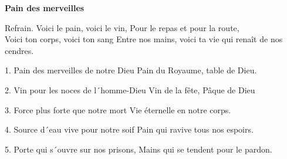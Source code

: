 \textbf{Pain des merveilles}

Refrain.
Voici le pain, voici le vin,
Pour le repas et pour la route,\\
Voici ton corps, voici ton sang
Entre nos mains, voici ta vie qui renaît de nos cendres.

1.
Pain des merveilles de notre Dieu
Pain du Royaume, table de Dieu.

2.
Vin pour les noces de l´homme-Dieu
Vin de la fête, Pâque de Dieu

3.
Force plus forte que notre mort
Vie éternelle en notre corps.

4.
Source d´eau vive pour notre soif
Pain qui ravive tous nos espoirs.

5.
Porte qui s´ouvre sur nos prisons,
Mains qui se tendent pour le pardon. 
